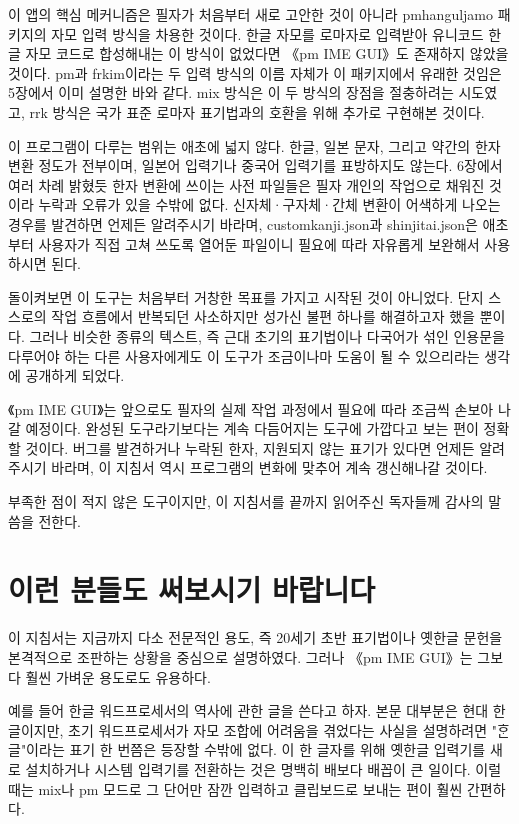 \documentclass{simplman}
\begin{document}
이 앱의 핵심 메커니즘은 필자가 처음부터 새로 고안한 것이 아니라 pmhanguljamo 패키지의 자모 입력 방식을 차용한 것이다. 한글 자모를 로마자로 입력받아 유니코드 한글 자모 코드로 합성해내는 이 방식이 없었다면 《pm IME GUI》도 존재하지 않았을 것이다. pm과 frkim이라는 두 입력 방식의 이름 자체가 이 패키지에서 유래한 것임은 5장에서 이미 설명한 바와 같다. mix 방식은 이 두 방식의 장점을 절충하려는 시도였고, rrk 방식은 국가 표준 로마자 표기법과의 호환을 위해 추가로 구현해본 것이다.

이 프로그램이 다루는 범위는 애초에 넓지 않다. 한글, 일본 문자, 그리고 약간의 한자 변환 정도가 전부이며, 일본어 입력기나 중국어 입력기를 표방하지도 않는다. 6장에서 여러 차례 밝혔듯 한자 변환에 쓰이는 사전 파일들은 필자 개인의 작업으로 채워진 것이라 누락과 오류가 있을 수밖에 없다. 신자체·구자체·간체 변환이 어색하게 나오는 경우를 발견하면 언제든 알려주시기 바라며, customkanji.json과 shinjitai.json은 애초부터 사용자가 직접 고쳐 쓰도록 열어둔 파일이니 필요에 따라 자유롭게 보완해서 사용하시면 된다.

돌이켜보면 이 도구는 처음부터 거창한 목표를 가지고 시작된 것이 아니었다. 단지 스스로의 작업 흐름에서 반복되던 사소하지만 성가신 불편 하나를 해결하고자 했을 뿐이다. 그러나 비슷한 종류의 텍스트, 즉 근대 초기의 표기법이나 다국어가 섞인 인용문을 다루어야 하는 다른 사용자에게도 이 도구가 조금이나마 도움이 될 수 있으리라는 생각에 공개하게 되었다.

《pm IME GUI》는 앞으로도 필자의 실제 작업 과정에서 필요에 따라 조금씩 손보아 나갈 예정이다. 완성된 도구라기보다는 계속 다듬어지는 도구에 가깝다고 보는 편이 정확할 것이다. 버그를 발견하거나 누락된 한자, 지원되지 않는 표기가 있다면 언제든 알려주시기 바라며, 이 지침서 역시 프로그램의 변화에 맞추어 계속 갱신해나갈 것이다.

부족한 점이 적지 않은 도구이지만, 이 지침서를 끝까지 읽어주신 독자들께 감사의 말씀을 전한다.


\section*{이런 분들도 써보시기 바랍니다}

이 지침서는 지금까지 다소 전문적인 용도, 즉 20세기 초반 표기법이나 옛한글 문헌을 본격적으로 조판하는 상황을 중심으로 설명하였다. 그러나 《pm IME GUI》는 그보다 훨씬 가벼운 용도로도 유용하다.

예를 들어 한글 워드프로세서의 역사에 관한 글을 쓴다고 하자. 본문 대부분은 현대 한글이지만, 초기 워드프로세서가 자모 조합에 어려움을 겪었다는 사실을 설명하려면 "ᄒᆞᆫ글"이라는 표기 한 번쯤은 등장할 수밖에 없다. 이 한 글자를 위해 옛한글 입력기를 새로 설치하거나 시스템 입력기를 전환하는 것은 명백히 배보다 배꼽이 큰 일이다. 이럴 때는 mix나 pm 모드로 그 단어만 잠깐 입력하고 클립보드로 보내는 편이 훨씬 간편하다.
\end{document}
